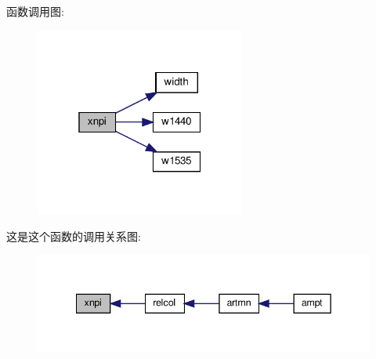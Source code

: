 函数调用图\+:
\nopagebreak
\begin{figure}[H]
\begin{center}
\leavevmode
\includegraphics[width=196pt]{xnpi_8f90_a75e45f790bab9043a104f81ae7d8e960_cgraph}
\end{center}
\end{figure}
这是这个函数的调用关系图\+:
\nopagebreak
\begin{figure}[H]
\begin{center}
\leavevmode
\includegraphics[width=342pt]{xnpi_8f90_a75e45f790bab9043a104f81ae7d8e960_icgraph}
\end{center}
\end{figure}
